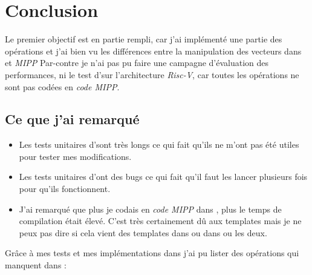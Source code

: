 \section{Conclusion}

Le premier objectif est en partie rempli, car j'ai implémenté une partie des opérations et
j'ai bien vu les différences entre la manipulation des vecteurs dans \Eigen et \emph{MIPP}
Par-contre je n'ai pas pu faire une campagne d'évaluation des performances, ni le test
d'\Eigen sur l'architecture \emph{Risc-V}, car toutes les opérations ne sont pas codées en
\emph{code MIPP}.

\subsection{Ce que j'ai remarqué}

\begin{itemize}
  \item Les tests unitaires d'\Eigen sont très longs ce qui fait qu'ils ne m'ont pas été utiles
  pour tester mes modifications.
  \item Les tests unitaires d'\Eigen ont des bugs ce qui fait qu'il faut les lancer
  plusieurs fois pour qu'ils fonctionnent.
  \item J'ai remarqué que plus je codais en \emph{code MIPP} dans \Eigen, plus le temps de
  compilation était élevé. C'est très certainement dû aux templates mais je ne peux pas dire
  si cela vient des templates dans \MIPP ou dans \Eigen ou les deux.
\end{itemize}

Grâce à mes tests et mes implémentations \MIPP dans \Eigen j'ai pu lister des opérations
qui manquent dans \MIPP :

